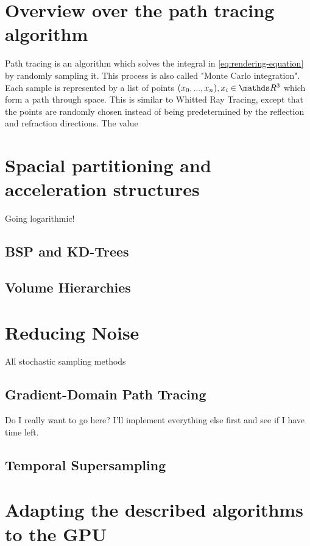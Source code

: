 \documentclass{ACGSeminar}
\begin{document}
\section{Overview over the path tracing algorithm} \label{path-tracing}
Path tracing is an algorithm which solves the integral in \eqref{eq:rendering-equation} by randomly sampling it. This process is also called "Monte Carlo integration". Each sample is represented by a list of points $(x_0, ..., x_n), x_i \in \R^3$ which form a path through space. This is similar to Whitted Ray Tracing, except that the points are randomly chosen instead of being predetermined by the reflection and refraction directions. The value 


\section{Spacial partitioning and acceleration structures} \label{acceleration}
Going logarithmic!
\subsection{BSP and KD-Trees}

\subsection{Volume Hierarchies}

\section{Reducing Noise} \label{noise}
All stochastic sampling methods 
\subsection{Gradient-Domain Path Tracing}
Do I really want to go here? \cite{Kettunen2015sg} I'll implement everything else first and see if I have time left.
\subsection{Temporal Supersampling}



\section{Adapting the described algorithms to the GPU} \label{gpu-adapting}
\end{document}
